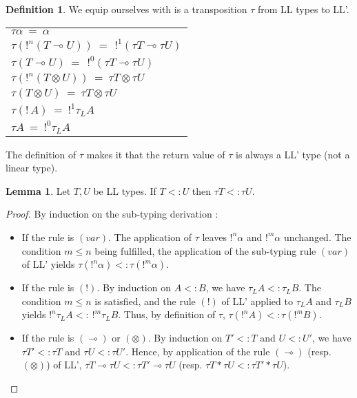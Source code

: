 \documentclass[10pt]{article}
\theoremstyle{plain}
\theoremstyle{definition}
\newtheorem{defn}{Definition}[subsection] %
\newtheorem{lemma}{Lemma}[section]
\def\bang{!\,}
\begin{document}
\begin{defn} We equip ourselves with is a transposition $\tau$ from LL types to LL'.
  \begin{center}
	\begin{tabular}{l}
		$\tau \alpha ~=~ \alpha$ \\
		$\tau(!^n (T \multimap U)) ~=~ \, !^1(\tau T \multimap \tau U)$ \\
		$\tau(T \multimap U) ~=~ \, !^0(\tau T \multimap \tau U)$ \\
		$\tau(!^n(T \otimes U)) ~=~ \tau T \otimes \tau U$ \\
		$\tau(T \otimes U) ~=~ \tau T \otimes \tau U$ \\
		$\tau(\bang A) ~ = ~ !^1 \tau_L A$ \\
		$\tau A ~ = ~ !^0 \tau_L A$
	\end{tabular}
	\end{center}
	The definition of $\tau$ makes it that the return value of $\tau$ is always a LL' type (not a linear type).
\end{defn}

\begin{lemma} Let $T, U$ be LL types. If $T <: U$ then $\tau T <: \tau U$.

	\begin{proof}
		By induction on the sub-typing derivation :
		\begin{itemize}
			\item If the rule is $(var)$. The application of $\tau$ leaves $!^n \alpha$ and $!^m \alpha$ unchanged.
				The condition $m \le n$ being fulfilled, the application of the sub-typing rule $(var)$ of LL' yields
				$\tau (!^n \alpha) <: \tau (!^m \alpha)$.
				
			\item If the rule is $(!)$. By induction on $A <: B$, we have $\tau_L A <: \tau_L B$. The condition $m \le n$
				is satisfied, and the rule $(!)$ of LL' applied to $\tau_L A$ and $\tau_L B$ yields $!^n \tau_L A <: ~ !^m \tau_L B$.
				Thus, by definition of $\tau$, $\tau (!^n A) <: \tau (!^m B)$.

			\item If the rule is $(\multimap)$ or $(\otimes)$. By induction on $T' <: T$ and $U <: U'$, we have $\tau T' <: \tau T$ and
				$\tau U <: \tau U'$. Hence, by application of the rule $(\multimap)$ (resp. $(\otimes)$) of LL',
				$\tau T \multimap \tau U <: \tau T' \multimap \tau U$ (resp. $\tau T * \tau U <: \tau T' * \tau U$).
				
		\end{itemize}
	\end{proof}
\end{lemma}
	
\end{document}
